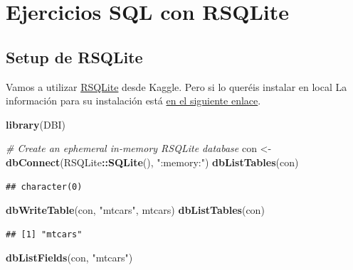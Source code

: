 \documentclass[
]{book}
\newenvironment{Shaded}{\begin{snugshade}}{\end{snugshade}}
\newcommand{\CommentTok}[1]{\textcolor[rgb]{0.56,0.35,0.01}{\textit{#1}}}
\newcommand{\KeywordTok}[1]{\textcolor[rgb]{0.13,0.29,0.53}{\textbf{#1}}}
\newcommand{\NormalTok}[1]{#1}
\newcommand{\OperatorTok}[1]{\textcolor[rgb]{0.81,0.36,0.00}{\textbf{#1}}}
\newcommand{\StringTok}[1]{\textcolor[rgb]{0.31,0.60,0.02}{#1}}
\begin{document}
\hypertarget{ejercicios-sql-con-rsqlite}{%
\section{Ejercicios SQL con RSQLite}\label{ejercicios-sql-con-rsqlite}}

\hypertarget{setup-de-rsqlite}{%
\subsection{Setup de RSQLite}\label{setup-de-rsqlite}}

Vamos a utilizar \href{https://cran.r-project.org/web/packages/RSQLite/index.html}{RSQLite} desde Kaggle. Pero si lo queréis instalar en local La información para su instalación está \href{https://db.rstudio.com/databases/sqlite/}{en el siguiente enlace}.

\begin{Shaded}
\begin{Highlighting}[]
\KeywordTok{library}\NormalTok{(DBI)}

\CommentTok{# Create an ephemeral in-memory RSQLite database}
\NormalTok{con <-}\StringTok{ }\KeywordTok{dbConnect}\NormalTok{(RSQLite}\OperatorTok{::}\KeywordTok{SQLite}\NormalTok{(), }\StringTok{":memory:"}\NormalTok{)}
\KeywordTok{dbListTables}\NormalTok{(con)}
\end{Highlighting}
\end{Shaded}

\begin{verbatim}
## character(0)
\end{verbatim}

\begin{Shaded}
\begin{Highlighting}[]
\KeywordTok{dbWriteTable}\NormalTok{(con, }\StringTok{"mtcars"}\NormalTok{, mtcars)}
\KeywordTok{dbListTables}\NormalTok{(con)}
\end{Highlighting}
\end{Shaded}

\begin{verbatim}
## [1] "mtcars"
\end{verbatim}

\begin{Shaded}
\begin{Highlighting}[]
\KeywordTok{dbListFields}\NormalTok{(con, }\StringTok{"mtcars"}\NormalTok{)}
\end{Highlighting}
\end{Shaded}
\end{document}
